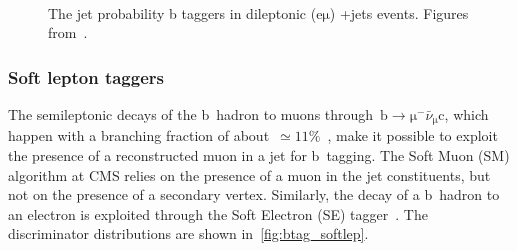 \begin{figure}
\begin{centering}
 \\
\caption[The jet probability b discriminator distributions]{The jet probability b taggers in dileptonic ($\mathrm{e\mu}$) \ttbar+jets events. Figures from~\cite{CMS-PAS-BTV-15-001}.}
\label{fig:btag_jbp}
\end{centering}
\end{figure}

\subsubsection{Soft lepton taggers}
The semileptonic decays of the b~hadron to muons through~$\mathrm{b} \rightarrow \mathrm{\mu}^- \bar{\nu}_{\mathrm{\mu}} \mathrm{c}$, which happen with a branching fraction of about~$\simeq 11\%$~\cite{Acciarri:1996wt}, make it possible to exploit the presence of a reconstructed muon in a jet for b~tagging. The Soft Muon (SM) algorithm at CMS relies on the presence of a muon in the jet constituents, but not on the presence of a secondary vertex. Similarly, the decay of a b~hadron to an electron is exploited through the Soft Electron (SE) tagger~\cite{CMS-PAS-BTV-15-001}. The discriminator distributions are shown in~\cref{fig:btag_softlep}.

